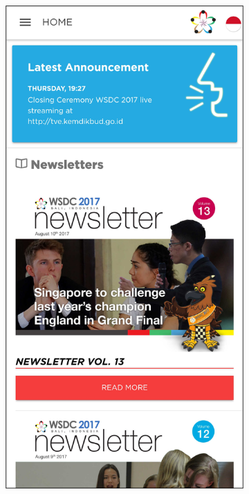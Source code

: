 \begin{figure}[H]
     \centering
     \begin{subfigure}[b]{0.247\textwidth}
        \centering
	    \includegraphics[scale=0.37]{Gambar/HomePage.png}

\end{subfigure}
\end{figure}
